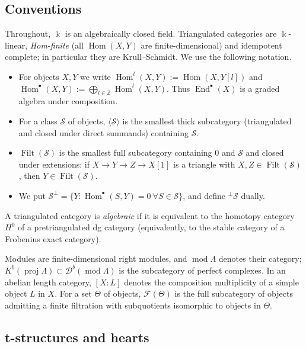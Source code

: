 \documentclass[11pt,reqno]{amsart}
\theoremstyle{plain}
\theoremstyle{definition}
\theoremstyle{remark}
\newcommand{\kk}{\Bbbk}
\DeclareMathOperator{\Hom}{Hom}
\DeclareMathOperator{\End}{End}
\DeclareMathOperator{\Filt}{Filt}
\newcommand{\modd}{\operatorname{mod}}
\newcommand{\proj}{\operatorname{proj}}
\newcommand{\Db}{\mathcal{D}^b}
\newcommand{\Kb}{K^b}
\newcommand{\thick}[1]{\langle #1\rangle}
\newcommand{\cF}{\mathcal{F}}
\begin{document}
\subsection{Conventions}
Throughout, $\kk$ is an algebraically closed field. Triangulated categories are $\kk$-linear, \emph{Hom-finite} (all $\Hom(X,Y)$ are finite-dimensional) and idempotent complete; in particular they are Krull--Schmidt. We use the following notation.
\begin{itemize}
\item For objects $X,Y$ we write $\Hom^l(X,Y):=\Hom(X,Y[l])$ and $\Hom^\bullet(X,Y):=\bigoplus_{l\in\mathbb{Z}}\Hom^l(X,Y)$. Thus $\End^\bullet(X)$ is a graded algebra under composition.
\item For a class $\mathcal S$ of objects, $\thick{\mathcal S}$ is the smallest thick subcategory (triangulated and closed under direct summands) containing $\mathcal S$.
\item $\Filt(\mathcal S)$ is the smallest full subcategory containing $0$ and $\mathcal S$ and closed under extensions: if $X\to Y\to Z\to X[1]$ is a triangle with $X,Z\in\Filt(\mathcal S)$, then $Y\in\Filt(\mathcal S)$.
\item We put $\mathcal S^\perp=\{Y:\Hom^\bullet(S,Y)=0\ \forall S\in\mathcal S\}$, and define ${}^\perp\mathcal S$ dually.
\end{itemize}
A triangulated category is \emph{algebraic} if it is equivalent to the homotopy category $H^0$ of a pretriangulated dg category (equivalently, to the stable category of a Frobenius exact category).

Modules are finite-dimensional right modules, and $\modd\Lambda$ denotes their category; $\Kb(\proj\Lambda)\subset\Db(\modd\Lambda)$ is the subcategory of perfect complexes. In an abelian length category, $[X:L]$ denotes the composition multiplicity of a simple object $L$ in $X$. For a set $\Theta$ of objects, $\cF(\Theta)$ is the full subcategory of objects admitting a finite filtration with subquotients isomorphic to objects in $\Theta$.

\subsection{t-structures and hearts}
\end{document}
